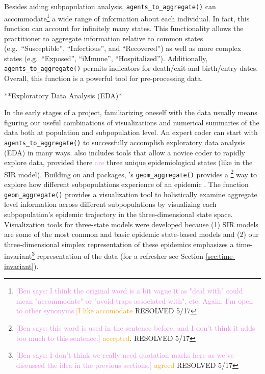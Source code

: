 \documentclass[
  shortnames]{jss}
\begin{document}
Besides aiding subpopulation analysis, \texttt{agents\_to\_aggregate()}
can
accommodate\footnote{\textcolor{violet}{[Ben says: I think the original word is a bit vague it as "deal with" could mean "accommodate" or "avoid traps associated with", etc. Again, I'm open to other synonyms.]}\textcolor{orange}{I like accomodate}  RESOLVED 5/17}
a wide range of information about each individual. In fact, this
function can account for infinitely many states. This functionality
allows the practitioner to aggregate information relative to common
states (e.g.~``Susceptible'', ``Infectious'', and ``Recovered'') as well
as more complex states (e.g.~``Exposed'', ``iMmune'', ``Hospitalized'').
Additionally, \texttt{agents\_to\_aggregate()} permits indicators for
death/exit and birth/entry dates. Overall, this function is a powerful
tool for pre-processing data.

**Exploratory Data Analysis (EDA)*

In the early stages of a project, familiarizing oneself with the data
usually means figuring out useful combinations of visualizations and
numerical summaries of the data both at population and subpopulation
level. An expert coder can start with \texttt{agents\_to\_aggregate()}
to successfully accomplish exploratory data analysis (EDA) in many ways.
 also includes tools that allow a novice coder to
rapidly explore data, provided there \textcolor{violet}{are} three
unique epidemiological states (like in the SIR model). Building on
 and  packages, 's
\texttt{geom\_aggregate()} provides a
\footnote{\textcolor{violet}{[Ben says: this word is used in the sentence before, and I don't think it adds too much to this sentence.]} \textcolor{orange}{accepted}. RESOLVED 5/17}
way to explore how different subpopulations experience of an epidemic
\citep{Wickham2016, Hamilton2018}. The function
\texttt{geom\_aggregate()} provides a visualization tool to holistically
examine aggregate level information across different subpopulations by
visualizing each subpopulation's epidemic trajectory in the
three-dimensional state space. Visualization tools for three-state
models were developed because (1) SIR models are some of the most common
and basic epidemic state-based models and (2) our three-dimensional
simplex representation of these epidemics emphasizes a
time-invariant\footnote{\textcolor{violet}{[Ben says: I don't think we really need quotation marks here as we've discussed the idea in the previous sections.]} \textcolor{orange}{agreed} RESOLVED 5/17}
representation of the data (for a refresher see Section
\ref{sec:time-invariant}).
\end{document}
